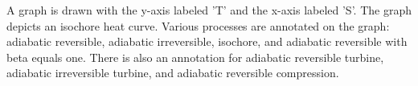 A graph is drawn with the y-axis labeled 'T' and the x-axis labeled 'S'. The graph depicts an isochore heat curve. Various processes are annotated on the graph: adiabatic reversible, adiabatic irreversible, isochore, and adiabatic reversible with beta equals one. There is also an annotation for adiabatic reversible turbine, adiabatic irreversible turbine, and adiabatic reversible compression.